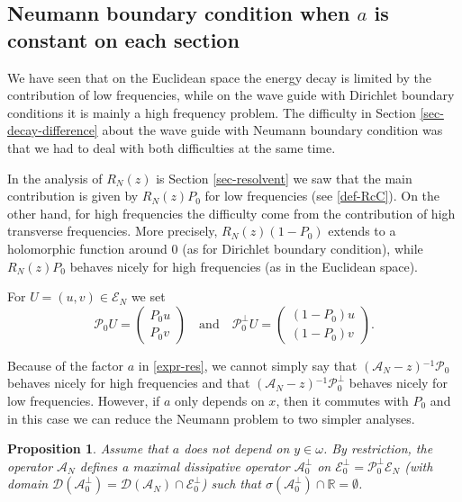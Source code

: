\documentclass[10pt, a4paper,reqno]{amsart}
\theoremstyle{plain}
\newtheorem{proposition}[theorem]{Proposition}
\theoremstyle{definition}
\theoremstyle{remark}
\begin{document}
\subsection{Neumann boundary condition when \texorpdfstring{$a$}{a} is constant on each section}

We have seen that on the Euclidean space the energy decay is limited by the contribution of low frequencies, while on the wave guide with Dirichlet boundary conditions it is mainly a high frequency problem. The difficulty in Section \ref{sec-decay-difference} about the wave guide with Neumann boundary condition was that we had to deal with both difficulties at the same time.

In the analysis of ${R_N(z)}$ is Section \ref{sec-resolvent} we saw that the main contribution is given by ${R_N(z)} P_0$ for low frequencies (see \eqref{def-RcC}). On the other hand, for high frequencies the difficulty come from the contribution of high transverse frequencies. More precisely, ${R_N(z)} (1-P_0)$ extends to a holomorphic function around 0 (as for Dirichlet boundary condition), while ${R_N(z)} P_0$ behaves nicely for high frequencies (as in the Euclidean space).

For $U = (u,v) \in {\mathscr E_N}$ we set 
\begin{equation} \label{def-Pc0}
{{\mathcal P}}_0 U = \begin{pmatrix} P_0 u \\ P_0 v \end{pmatrix} \quad \text{and} \quad {{\mathcal P}}_0^\bot U = \begin{pmatrix} (1-P_0) u \\ (1-P_0) v \end{pmatrix}.
\end{equation}

Because of the factor $a$ in \eqref{expr-res}, we cannot simply say that $({{{\mathcal A}}_N}-z){^{-1}} {{\mathcal P}}_0$ behaves nicely for high frequencies and that $({{{\mathcal A}}_N}-z){^{-1}} {{\mathcal P}}_0^\bot$ behaves nicely for low frequencies. However, if $a$ only depends on $x$, then it commutes with $P_0$ and in this case we can reduce the Neumann problem to two simpler analyses.

\begin{proposition} \label{prop-low-freq-bot}
Assume that $a$ does not depend on $y \in {\omega}$. By restriction, the operator ${{{\mathcal A}}_N}$ defines a maximal dissipative operator ${{{\mathcal A}}_0^\bot}$ on ${{\mathscr E}_0^\bot} = {{\mathcal P}}_0^\bot {\mathscr E_N}$ (with domain ${{\mathcal D}}({{{\mathcal A}}_0^\bot}) = {{\mathcal D}}({{{\mathcal A}}_N}) \cap {{\mathscr E}_0^\bot}$) such that ${\sigma}({{{\mathcal A}}_0^\bot}) \cap {\mathbb{R}} = \emptyset$.
\end{proposition}
\end{document}
